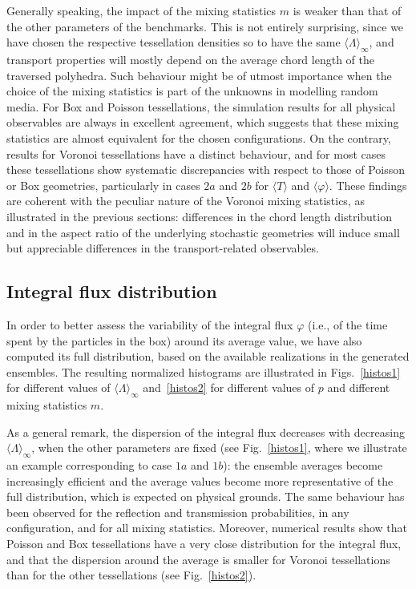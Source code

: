 \documentclass[final,authoryear,5p,times,twocolumn]{elsarticle}
\begin{document}
Generally speaking, the impact of the mixing statistics $m$ is weaker than that of the other parameters of the benchmarks. This is not entirely surprising, since we have chosen the respective tessellation densities so to have the same ${\langle \Lambda \rangle}_{\infty}$, and transport properties will mostly depend on the average chord length of the traversed polyhedra. Such behaviour might be of utmost importance when the choice of the mixing statistics is part of the unknowns in modelling random media. For Box and Poisson tessellations, the simulation results for all physical observables are always in excellent agreement, which suggests that these mixing statistics are almost equivalent for the chosen configurations. On the contrary, results for Voronoi tessellations have a distinct behaviour, and for most cases these tessellations show systematic discrepancies with respect to those of Poisson or Box geometries, particularly in cases $2a$ and $2b$ for $\langle T \rangle$ and $\langle \varphi \rangle$. These findings are coherent with the peculiar nature of the Voronoi mixing statistics, as illustrated in the previous sections: differences in the chord length distribution and in the aspect ratio of the underlying stochastic geometries will induce small but appreciable differences in the transport-related observables.

\subsection{Integral flux distribution}

In order to better assess the variability of the integral flux $\varphi$ (i.e., of the time spent by the particles in the box) around its average value, we have also computed its full distribution, based on the available realizations in the generated ensembles. The resulting normalized histograms are illustrated in Figs.~\ref{histos1} for different values of ${\langle \Lambda \rangle}_{\infty}$ and~\ref{histos2} for different values of $p$ and different mixing statistics $m$.

As a general remark, the dispersion of the integral flux decreases with decreasing ${\langle \Lambda \rangle}_{\infty}$, when the other parameters are fixed (see Fig.~\ref{histos1}, where we illustrate an example corresponding to case $1a$ and $1b$): the ensemble averages become increasingly efficient and the average values become more representative of the full distribution, which is expected on physical grounds. The same behaviour has been observed for the reflection and transmission probabilities, in any configuration, and for all mixing statistics. Moreover, numerical results show that Poisson and Box tessellations have a very close distribution for the integral flux, and that the dispersion around the average is smaller for Voronoi tessellations than for the other tessellations (see Fig.~\ref{histos2}).
\end{document}
